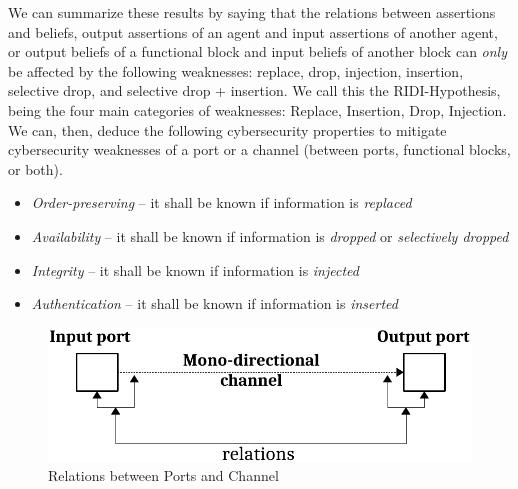 \documentclass[conference]{IEEEtran}
\begin{document}
We can summarize these results by saying that the relations between assertions
and beliefs, output assertions of an agent and input assertions of another
agent, or output beliefs of a functional block and input beliefs of another
block can \emph{only} be affected by the following weaknesses: replace, drop,
injection, insertion, selective drop, and selective drop + insertion. 
We call this the RIDI-Hypothesis, being the
four main categories of weaknesses: Replace, Insertion, Drop, Injection. We can,
then, deduce the following cybersecurity properties to mitigate cybersecurity weaknesses
of a port or a channel (between ports, functional blocks, or both).
\begin{itemize}
	\item \emph{Order-preserving} -- it shall be known if information is \emph{replaced}
	\item \emph{Availability} -- it shall be known if information is \emph{dropped} or \emph{selectively dropped}
	\item \emph{Integrity} -- it shall be known if information is \emph{injected}
	\item \emph{Authentication} -- it shall be known if information is \emph{inserted}
\end{itemize}


\begin{figure}[t]
	\centering
	\includegraphics[width=.9\columnwidth]{engineering_relations.pdf}
	\caption{Relations between Ports and Channel}
	\label{fig:atom}
\end{figure}
\end{document}
